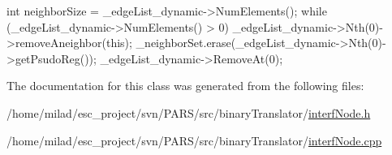 \begin{DoxyCode}
                                 {
        int neighborSize = _edgeList_dynamic->NumElements();
        while (_edgeList_dynamic->NumElements() > 0) {
                _edgeList_dynamic->Nth(0)->removeAneighbor(this);
                _neighborSet.erase(_edgeList_dynamic->Nth(0)->getPsudoReg());
                _edgeList_dynamic->RemoveAt(0);
        }
}
\end{DoxyCode}


The documentation for this class was generated from the following files:\begin{DoxyCompactItemize}
\item 
/home/milad/esc\_\-project/svn/PARS/src/binaryTranslator/\hyperlink{interfNode_8h}{interfNode.h}\item 
/home/milad/esc\_\-project/svn/PARS/src/binaryTranslator/\hyperlink{interfNode_8cpp}{interfNode.cpp}\end{DoxyCompactItemize}
